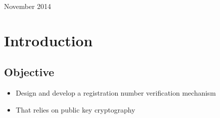 \documentclass{article}
\begin{document}
\begin{titlepage}
\begin{center}
  \vspace{15 mm}


  {\large November 2014}\\[3cm] %




  \vfill %
  \end{center}
  \end{titlepage}



  \section{Introduction}

  \subsection{Objective}

  \begin{itemize}
    \item Design and develop a registration number verification mechanism
    \item That relies on public key cryptography
  \end{itemize}
\end{document}
